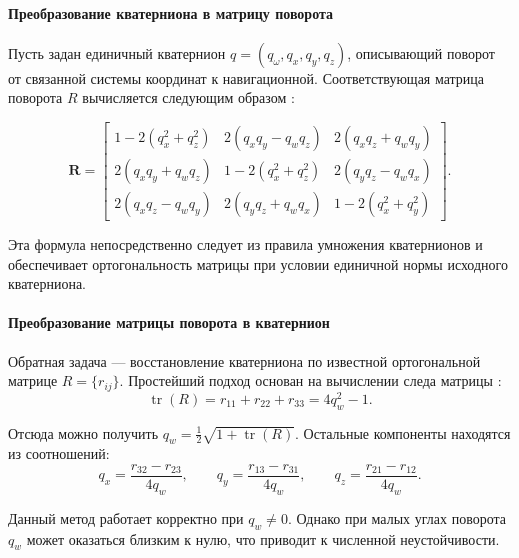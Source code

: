 \paragraph{Преобразование кватерниона в матрицу поворота}
Пусть задан единичный кватернион $q = (q_{\omega}, q_x, q_y, q_z)$, описывающий поворот от связанной системы координат к навигационной. Соответствующая матрица поворота $R$ вычисляется следующим образом \cite{salamin1974quaternions}:

\begin{equation}
	\label{eq:rotation_matrix_from_q}
	\bm{R} =
	\begin{bmatrix}
		1 - 2(q_x^2 + q_z^2) & 2(q_x q_y - q_w q_z) & 2(q_x q_z + q_w q_y) \\
		2(q_x q_y + q_w q_z) & 1 - 2(q_x^2 + q_z^2) & 2(q_y q_z - q_w q_x) \\
		2(q_x q_z - q_w q_y) & 2(q_y q_z + q_w q_x) & 1 - 2(q_x^2 + q_y^2)
	\end{bmatrix} \text{.}
\end{equation}

Эта формула непосредственно следует из правила умножения кватернионов и обеспечивает ортогональность матрицы при условии единичной нормы исходного кватерниона.


\paragraph{Преобразование матрицы поворота в кватернион}
Обратная задача — восстановление кватерниона по известной ортогональной матрице $R = \{r_{ij}\}$. Простейший подход основан на вычислении следа матрицы \cite{salamin1974quaternions}:
\begin{equation*}
	\operatorname{tr}(R) = r_{11} + r_{22} + r_{33} = 4q_w^2 - 1 \text{.}
\end{equation*}

Отсюда можно получить $q_w = \frac{1}{2} \sqrt{1 + \operatorname{tr}(R)}$. Остальные компоненты находятся из соотношений:
\begin{equation*}
	q_x = \frac{r_{32} - r_{23}}{4q_w}, \qquad
	q_y = \frac{r_{13} - r_{31}}{4q_w}, \qquad
	q_z = \frac{r_{21} - r_{12}}{4q_w} \text{.}
\end{equation*}

Данный метод работает корректно при $q_w \neq 0$. Однако при малых углах поворота $q_w$ может оказаться близким к нулю, что приводит к численной неустойчивости.


